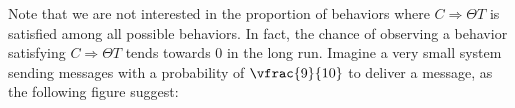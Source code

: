         
        
        
        
        
        
        
        
        
        
        
        
        
        
        
        
        
        
			
        			Note that we are not interested in the proportion of behaviors where
        			$C\Rightarrow\Theta T$ is satisfied among all possible behaviors. In fact,
        			the chance of observing a behavior satisfying $C\Rightarrow\Theta T$
        			tends towards $0$ in the long run. Imagine a very small system sending
        			messages with a probability of $\vfrac{9}{10}$ to deliver a message, as the following
        			figure suggest:
			
